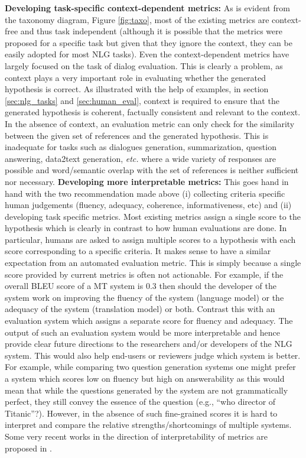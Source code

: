 \noindent \textbf{Developing task-specific context-dependent metrics:} As is evident from the taxonomy diagram, Figure \ref{fig:taxo}, 
most of the existing metrics are context-free and thus task independent (although it is possible that the metrics were proposed for a specific task but given that they ignore the context, they can be easily adopted for most NLG tasks). Even the context-dependent metrics have largely focused on the task of dialog evaluation. This is clearly a problem, as context plays a very important role in evaluating whether the generated hypothesis is correct. As illustrated with the help of examples, in section \ref{sec:nlg_tasks} and \ref{sec:human_eval}, context is required to ensure that the generated hypothesis is coherent, factually consistent and relevant to the context. In the absence of context, an evaluation metric can only check for the similarity between the given set of references and the generated hypothesis. This is inadequate for tasks such as dialogues generation, summarization, question answering, data2text generation, \textit{etc.} where a wide variety of responses are possible and word/semantic overlap with the set of references is neither sufficient nor necessary. 
\noindent \textbf{Developing more interpretable metrics:} This goes hand in hand with the two recommendation made above (i) collecting criteria specific human judgements (fluency, adequacy, coherence, informativeness, etc) and (ii) developing task specific metrics. Most existing metrics assign a single score to the hypothesis which is clearly in contrast to how human evaluations are done. In particular, humans are asked to assign multiple scores to a hypothesis with each score corresponding to a specific criteria. It makes sense to have a similar expectation from an automated evaluation metric. This is simply because a single score provided by current metrics is often not actionable. For example, if the overall BLEU score of a MT system is 0.3 then should the developer of the system work on improving the fluency of the system (language model) or the adequacy of the system (translation model) or both. Contrast this with an evaluation system which assigns a separate score for fluency and adequacy. The output of such an evaluation system would be more interpretable and hence provide clear future directions to the researchers and/or developers of the NLG system. This would also help end-users or reviewers judge which system is better. For example, while comparing two question generation systems one might prefer a system which scores low on fluency but high on answerability as this would mean that while the questions generated by the system are not  grammatically perfect, they still convey the essence of the question (e.g., ``who director of Titanic''?). However, in the absence of such fine-grained scores it is hard to interpret and compare the relative strengths/shortcomings of multiple systems. Some very recent works in the direction of interpretability of metrics are proposed in .
